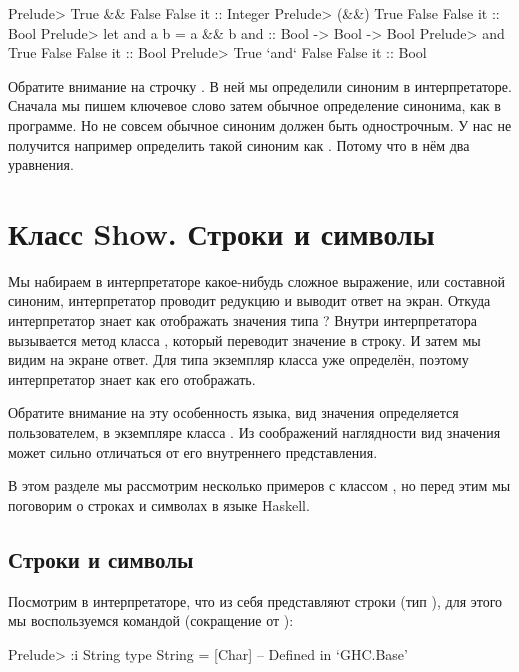 \begin{code}
Prelude> True && False
False
it :: Integer
Prelude> (&&) True False
False
it :: Bool
Prelude> let and a b = a && b
and :: Bool -> Bool -> Bool
Prelude> and True False
False
it :: Bool
Prelude> True `and` False
False
it :: Bool
\end{code}

Обратите внимание на строчку .
В ней мы определили синоним в интерпретаторе. 
Сначала мы пишем ключевое слово 
 затем 
обычное определение синонима, как в программе.
Но не совсем обычное синоним должен быть однострочным.
У нас не получится например определить такой
синоним как . Потому что в нём два уравнения.


\section{Класс Show. Строки и символы}

Мы набираем в интерпретаторе какое-нибудь
сложное выражение, или составной синоним, интерпретатор
проводит редукцию и выводит ответ на экран. 
Откуда интерпретатор знает как отображать
значения типа ? Внутри интерпретатора 
вызывается метод класса , который переводит
значение в строку. И затем мы видим на экране ответ.  
Для типа  экземпляр класса  уже определён,
поэтому интерпретатор знает как его отображать.

Обратите внимание на эту особенность языка, вид значения
определяется пользователем, в экземпляре класса . 
Из соображений наглядности вид значения может сильно отличаться 
от его внутреннего представления. 

В этом разделе мы рассмотрим несколько примеров с
классом , но перед этим мы поговорим о строках и
символах в языке Haskell. 

\subsection{Строки и символы}

Посмотрим в интерпретаторе, что из себя представляют строки 
 (тип ),
для этого мы воспользуемся командой  (сокращение от ):

\begin{code}
Prelude> :i String
type String = [Char] 	-- Defined in `GHC.Base'
\end{code}

